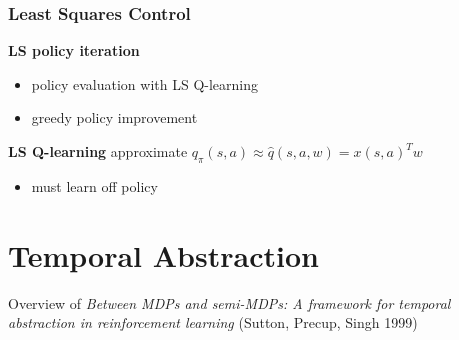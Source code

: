 \documentclass[]{article}
\theoremstyle{definition}
\begin{document}
\subsubsection{Least Squares Control}%
\label{ssub:least_squares_control}
\textbf{LS policy iteration}
\begin{itemize}
    \item policy evaluation with LS Q-learning
    \item greedy policy improvement
\end{itemize}
\textbf{LS Q-learning} approximate $q_\pi(s,a) \approx \hat q(s,a,w) = x(s,a)^T w$
\begin{itemize}
    \item must learn off policy
\end{itemize}








\section{Temporal Abstraction}
\label{sec:temporal}
Overview of \textit{Between MDPs and semi-MDPs: A framework for temporal abstraction in reinforcement learning} (Sutton, Precup, Singh 1999)
\end{document}

